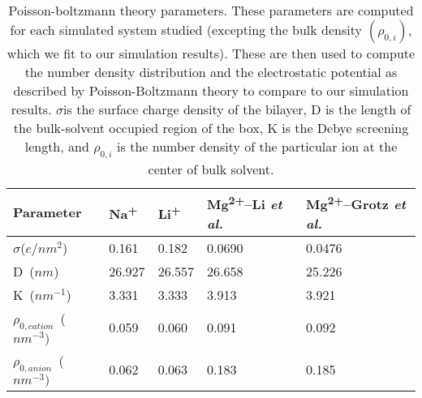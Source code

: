 \documentclass[journal=langd5,manuscript=article]{achemso}
\newcommand{\etal}{\textit{et al.}~}
\newcommand{\na}{Na\textsuperscript{+}~}
\newcommand{\li}{Li\textsuperscript{+}~}
\newcommand{\mgmbnbfix}{Mg\textsuperscript{2+}--Li \etal} %
\newcommand{\mgmicro}{Mg\textsuperscript{2+}--Grotz \etal}
\newcommand{\sig}{$\sigma$}
\begin{document}
\begin{table}
    \caption{Poisson-boltzmann theory parameters. These parameters are computed for each
    simulated system studied (excepting the bulk density $(\rho_{0,i})$, 
    which we fit to our simulation results). These are then used to compute the
    number density distribution and the electrostatic potential as described by 
    Poisson-Boltzmann theory to compare to our simulation results.
    \sig is the surface charge density of the bilayer, D is the length
    of the bulk-solvent occupied region of the box, K is the Debye
    screening length, and $\rho_{0,i}$ is the number density of the particular 
    ion at the center of bulk solvent.}
    \label{tab:gctheory}
    \begin{tabularx}{\textwidth}{|X|X|X|X|X|}\hline
        Parameter                    & \na  & \li    & \mgmbnbfix    & \mgmicro \\\hline
        \sig ($e/nm^{2}$)            &0.161 &0.182   &0.0690  &0.0476     \\\hline
        D~($nm$)                     &26.927&26.557  &26.658  &25.226     \\\hline
        K~($nm^{-1}$)                &3.331 &3.333   &3.913   &3.921      \\\hline
        $\rho_{0,cation}$~($nm^{-3})$&0.059 &0.060   &0.091   &0.092      \\\hline
        $\rho_{0,anion}$~($nm^{-3})$ &0.062 &0.063   &0.183   &0.185      \\\hline
    \end{tabularx}
\end{table}
\clearpage
\end{document}
